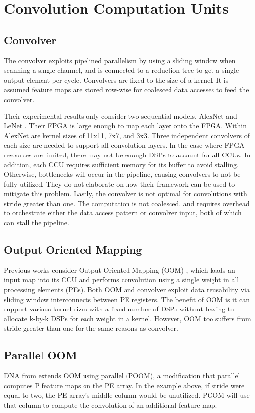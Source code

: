 \section{Convolution Computation Units}
\subsection{Convolver}
The convolver \cite{liu2016automatic} exploits pipelined parallelism by using a sliding window when scanning a single channel, and is connected to a reduction tree to get a single output element per cycle. Convolvers are fixed to the size of a kernel. It is assumed feature maps are stored row-wise for coalesced data accesses to feed the convolver.

Their experimental results only consider two sequential models, AlexNet \cite{krizhevsky2012imagenet} and LeNet \cite{lecun1998gradient}. Their FPGA is large enough to map each layer onto the FPGA. Within AlexNet are kernel sizes of 11x11, 7x7, and 3x3. Three independent convolvers of each size are needed to support all convolution layers. In the case where FPGA resources are limited, there may not be enough DSPs to account for all CCUs. In addition, each CCU requires sufficient memory for its buffer to avoid stalling. Otherwise, bottlenecks will occur in the pipeline, causing convolvers to not be fully utilized. They do not elaborate on how their framework can be used to mitigate this problem. Lastly, the convolver is not optimal for convolutions with stride greater than one. The computation is not coalesced, and requires overhead to orchestrate either the data access pattern or convolver input, both of which can stall the pipeline.

\subsection{Output Oriented Mapping}
Previous works consider Output Oriented Mapping (OOM) \cite{zhang2015optimizing, chen2017eyeriss, rahman2016efficient}, which loads an input map into its CCU and performs convolution using a single weight in all processing elements (PEs). Both OOM and convolver exploit data reusability via sliding window interconnects between PE registers. The benefit of OOM is it can support various kernel sizes with a fixed number of DSPs without having to allocate k-by-k DSPs for each weight in a kernel. However, OOM too suffers from stride greater than one for the same reasons as convolver.

\subsection{Parallel OOM}
DNA from \cite{tu2017deep} extends OOM using parallel (POOM), a modification that parallel computes P feature maps on the PE array. In the example above, if stride were equal to two, the PE array’s middle column would be unutilized. POOM will use that column to compute the convolution of an additional feature map.

